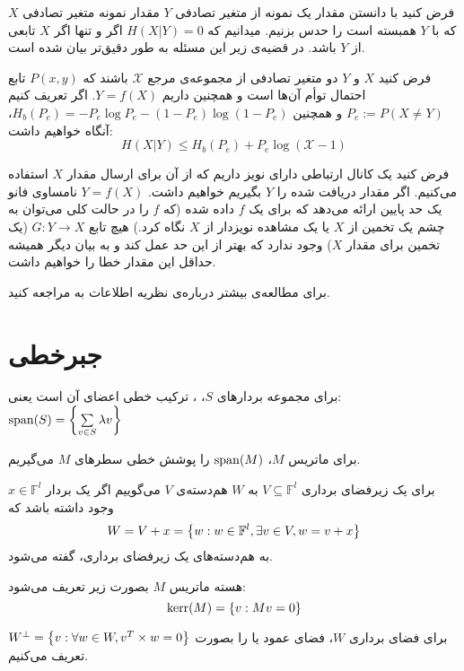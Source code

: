 فرض کنید با دانستن مقدار یک نمونه از متغیر تصادفی
$Y$
مقدار نمونه متغیر تصادفی
$X$
که با
$Y$
همبسته است را حدس بزنیم. میدانیم که
$H(X|Y) = 0$
اگر و تنها اگر
$X$
تابعی از
$Y$
باشد. در قضیه‌ی زیر این مسئله به طور دقیق‌تر بیان شده است.
\begin{theorem}
فرض کنید
$X$ و $Y$
دو متغیر تصادفی از مجموعه‌ی مرجع
$\mathcal{X}$
باشند که
$P(x, y)$
تابع احتمال توأم آن‌ها است و همچنین داریم
$Y = f(X)$.
اگر تعریف کنیم
$P_e := P(X \neq Y)$
و همچنین
$H_b(P_e) = - P_e \log P_e - (1 - P_e) \log(1 - P_e)$،
آنگاه خواهیم داشت:
$$H(X|Y) \leq H_b(P_e) + P_e \log(\mathcal{X} - 1)$$
\end{theorem}
\begin{remark}
	فرض کنید یک کانال ارتباطی دارای نویز داریم که از آن برای ارسال مقدار
	$X$
	استفاده می‌کنیم. اگر مقدار دریافت شده را
	$Y$
	بگیریم خواهیم داشت.
	$Y = f(X)$
	 نامساوی فانو یک حد پایین ارائه می‌دهد که برای یک
$f$
داده شده (که
$f$
را در حالت کلی می‌توان به چشم یک تخمین از
$X$
یا یک مشاهده نویزدار از
$X$
نگاه کرد.) هیچ تابع
$G:Y \rightarrow X$
(یک تخمین برای مقدار
$X$)
وجود ندارد که بهتر از این حد عمل کند و به بیان دیگر همیشه حداقل این مقدار خطا را خواهیم داشت.
\end{remark}

	برای مطالعه‌ی بیشتر درباره‌ی نظریه اطلاعات به
\cite{book:info}
مراجعه کنید.
\section{جبرخطی}
\begin{definition}
	برای مجموعه بردار‌های
	$S$، ،
	ترکیب خطی اعضای آن است یعنی:
	$\operatorname{span}(S) = \left\{  \sum\limits_{v \in S} \lambda v \right\}$
	
	برای ماتریس
	$M$، $\operatorname{span}(M)$
را پوشش خطی سطرهای 
$M$
می‌گیریم.
\end{definition}

\begin{definition}[هم‌دسته]
	\label{coset}
	برای یک زیرفضای برداری
	$V \subseteq \mathbb{F}^l$
	به
	$W$
	هم‌دسته‌‌‌ی
	$V$
	می‌گوییم اگر یک بردار
	$x \in \mathbb{F}^l$
	وجود داشته باشد که
	$$W = V + x = \left\{ w: w \in \mathbb{F}^l, \exists v \in V, w = v + x \right\}$$
	به هم‌دسته‌های یک زیرفضای برداری،
	گفته می‌شود.
\end{definition}
\begin{definition}
	هسته ماتریس
	$M$
	بصورت زیر تعریف می‌شود:
	$$\operatorname{kerr}(M) = \left\{ v: Mv = 0 \right\}$$
\end{definition}
\begin{definition}
برای فضای برداری
$W$،
فضای عمود یا 
 را بصورت
$W^\bot = \left\{ v: \forall w \in W, v^T \times w = 0 \right\}$
تعریف می‌کنیم.
\end{definition}

